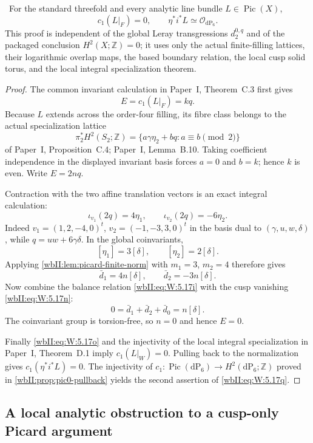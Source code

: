 \begin{proposition}
\label{wbII:prop:direct-boundary-picard}
\ For the standard threefold and every analytic line bundle
$L\in\operatorname{Pic}(X)$,
\[
 c_1(L|_F)=0,
 \qquad
 \eta^*i^*L\simeq\mathcal O_{\mathrm{dP}_6}.
\tag{W.41}\label{wbII:eq:W:5.17q}
\]
This proof is independent of the global Leray transgressions
$d_2^{0,q}$ and of the packaged conclusion $H^2(X;\mathbb Z)=0$; it uses
only the actual finite-filling lattices, their logarithmic overlap maps, the
based boundary relation, the local cusp solid torus, and the local integral
specialization theorem.
\end{proposition}

\begin{proof}
The common invariant calculation in Paper~I, Theorem~C.3 first gives
\[
 E=c_1(L|_F)=kq.
\]
Because $L$ extends across the order-four filling, its fibre class belongs
to the actual specialization lattice
\[
 \pi_2^*H^2(S_2;\mathbb Z)
 =\{a\gamma\eta_2+bq:a\equiv b\pmod2\}
\]
of Paper~I, Proposition~C.4; Paper~I, Lemma~B.10.  Taking
coefficient independence in the displayed invariant basis forces
$a=0$ and $b=k$; hence $k$ is even.  Write $E=2nq$.

Contraction with the two affine translation vectors is an exact integral
calculation:
\[
 \iota_{v_1}(2q)=4\eta_1,
 \qquad
 \iota_{v_2}(2q)=-6\eta_2.
\tag{W.42}\label{wbII:eq:W:5.17r}
\]
Indeed $v_1=(1,2,-4,0)^t$, $v_2=(-1,-3,3,0)^t$ in the basis dual to
$(\gamma,u,w,\delta)$, while
$q=uw+6\gamma\delta$.  In the global coinvariants,
\[
 [\eta_1]=3[\delta],\qquad [\eta_2]=2[\delta].
\]
Applying \cref{wbII:lem:picard-finite-norm} with $m_1=3$, $m_2=4$ therefore
gives
\[
 \bar d_1=4n[\delta],\qquad
 \bar d_2=-3n[\delta].
\tag{W.43}\label{wbII:eq:W:5.17s}
\]
Now combine the balance relation \eqref{wbII:eq:W:5.17i} with the cusp vanishing \eqref{wbII:eq:W:5.17n}:
\[
 0=\bar d_1+\bar d_2+\bar d_0=n[\delta].
\]
The coinvariant group is torsion-free, so $n=0$ and hence $E=0$.

Finally \eqref{wbII:eq:W:5.17o} and the injectivity of the local integral specialization in
Paper~I, Theorem~D.1 imply
$c_1(L|_W)=0$.  Pulling back to the normalization gives
$c_1(\eta^*i^*L)=0$.  The injectivity of
$c_1:\operatorname{Pic}(\mathrm{dP}_6)\to
H^2(\mathrm{dP}_6;\mathbb Z)$ proved in
\cref{wbII:prop:pic0-pullback} yields the second assertion of \eqref{wbII:eq:W:5.17q}.
\end{proof}

\subsection{A local analytic obstruction to a cusp-only Picard argument}
\label{wbII:subsec:local-cusp-picard-obstruction}

